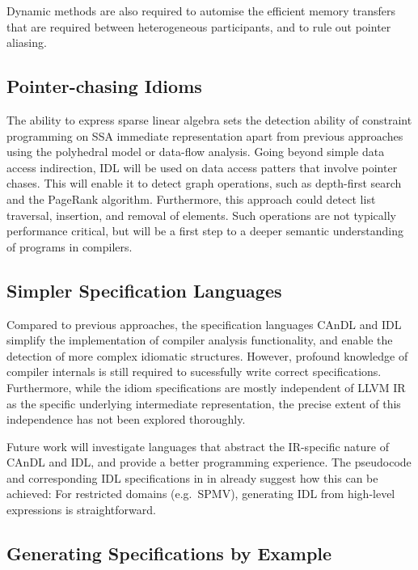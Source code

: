     Dynamic methods are also required to automise the efficient memory transfers
    that are required between heterogeneous participants, and to rule out
    pointer aliasing.

\subsection*{Pointer-chasing Idioms}

    The ability to express sparse linear algebra sets the detection ability of
    constraint programming on SSA immediate representation apart from previous
    approaches using the polyhedral model or data-flow analysis.
    Going beyond simple data access indirection, IDL will be used on data access
    patters that involve pointer chases.
    This will enable it to detect graph operations, such as depth-first search
    and the PageRank algorithm.
    Furthermore, this approach could detect list traversal, insertion, and
    removal of elements.
    Such operations are not typically performance critical, but will be a first
    step to a deeper semantic understanding of programs in compilers.

\subsection*{Simpler Specification Languages}

    Compared to previous approaches, the specification languages CAnDL and IDL
    simplify the implementation of compiler analysis functionality, and enable
    the detection of more complex idiomatic structures.
    However, profound knowledge of compiler internals is still required to
    sucessfully write correct specifications.
    Furthermore, while the idiom specifications are mostly independent of
    LLVM IR as the specific underlying intermediate representation, the precise
    extent of this independence has not been explored thoroughly.

    Future work will investigate languages that abstract the IR-specific nature
    of CAnDL and IDL, and provide a better programming experience.
    The pseudocode and corresponding IDL specifications in
     in  already
    suggest how this can be achieved:
    For restricted domains (e.g.\ SPMV), generating IDL from high-level
    expressions is straightforward.

\subsection*{Generating Specifications by Example}

